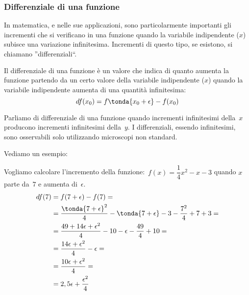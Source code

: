 \subsubsection{Differenziale di una funzione}
\label{subsubsec:diff01_parteprincipale}

In matematica, e nelle sue applicazioni, sono particolarmente importanti 
gli incrementi che si verificano in una funzione quando la variabile 
indipendente (\(x\)) subisce una variazione infinitesima. Incrementi di 
questo tipo, se esistono, si chiamano ''differenziali``.

\begin{definizione}
 Il differenziale di una funzione è un valore che indica di quanto aumenta 
la funzione partendo da un certo valore della variabile indipendente 
(\(x\)) quando la variabile indipendente aumenta di una quantità 
infinitesima:
\[df(x_0) = f \tonda{x_0 + \epsilon} - f(x_0)\]
\end{definizione}

Parliamo di differenziale di una funzione quando incrementi infinitesimi 
della~$x$ producono incrementi infinitesimi della~$y$.
I differenziali, essendo infinitesimi, sono osservabili solo utilizzando 
microscopi non standard.

\begin{minipage}{.48 \textwidth}
Vediamo un esempio: 

Vogliamo calcolare l'incremento della 
funzione:~\(f(x) = \dfrac{1}{4} x^2 -x -3\)
quando \(x\) parte da~\(7\) e aumenta di~\(\epsilon\).
\begin{align*}
  df(7) &= f(7+\epsilon) - f(7) = \\
        &= \dfrac{\tonda{7 +\epsilon}^2}{4}  -\tonda{7 +\epsilon} -3 - 
           \dfrac{7^2}{4}  +7 +3 =\\
        &= \dfrac{49 +14 \epsilon +\epsilon^2}{4} -10 -\epsilon - 
           \dfrac{49}{4} +10 =\\
        &= \dfrac{14 \epsilon +\epsilon^2}{4} -\epsilon =\\
        &= \dfrac{10 \epsilon +\epsilon^2}{4} =\\
        &= 2,5 \epsilon + \dfrac{\epsilon^2}{4} %
\end{align*}
\end{minipage}
 \hfill
\begin{minipage}{.48 \textwidth}
 \begin{center}
\differenziale
 \end{center}
\end{minipage}

